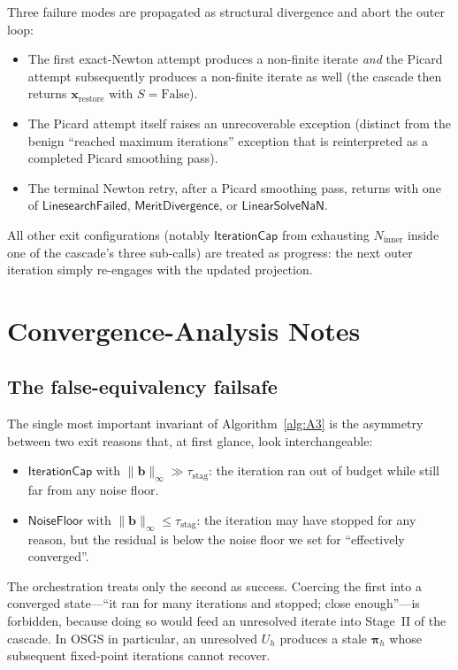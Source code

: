 \documentclass{article}
\newcommand{\textstag}{\tau_{\mathrm{stag}}}
\begin{document}
Three failure modes are propagated as structural divergence and abort
the outer loop:
\begin{itemize}
\item The first exact-Newton attempt produces a non-finite iterate
\emph{and} the Picard attempt subsequently produces a non-finite
iterate as well (the cascade then returns
$\boldsymbol{x}_{\mathrm{restore}}$ with $S = \mathrm{False}$).
\item The Picard attempt itself raises an unrecoverable exception
(distinct from the benign ``reached maximum iterations'' exception
that is reinterpreted as a completed Picard smoothing pass).
\item The terminal Newton retry, after a Picard smoothing pass,
returns with one of $\mathsf{LinesearchFailed}$,
$\mathsf{MeritDivergence}$, or $\mathsf{LinearSolveNaN}$.
\end{itemize}
All other exit configurations (notably $\mathsf{IterationCap}$ from
exhausting $N_{\mathrm{inner}}$ inside one of the cascade's three
sub-calls) are treated as progress: the next outer iteration simply
re-engages with the updated projection.

\section{Convergence-Analysis Notes}
\label{sec:falseEquiv}

\subsection{The false-equivalency failsafe}

The single most important invariant of Algorithm~\ref{alg:A3} is the
asymmetry between two exit reasons that, at first glance, look
interchangeable:
\begin{itemize}
\item $\mathsf{IterationCap}$ with $\|\boldsymbol{b}\|_\infty \gg \textstag$:
the iteration ran out of budget while still far from any noise floor.
\item $\mathsf{NoiseFloor}$ with $\|\boldsymbol{b}\|_\infty \le \textstag$:
the iteration may have stopped for any reason, but the residual is below
the noise floor we set for ``effectively converged''.
\end{itemize}
The orchestration treats only the second as success. Coercing the
first into a converged state---``it ran for many iterations and
stopped; close enough''---is forbidden, because doing so would feed an
unresolved iterate into Stage~II of the cascade. In OSGS in particular,
an unresolved $U_h$ produces a stale $\boldsymbol{\pi}_h$ whose
subsequent fixed-point iterations cannot recover.
\end{document}
